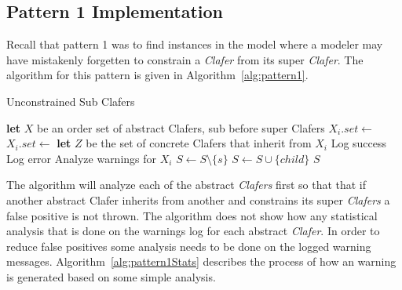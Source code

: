 \documentclass[10pt,oneside]{IEEEtran}
\begin{document}
\subsection{Pattern 1 Implementation}
Recall that pattern 1 was to find instances in the model where a modeler may have mistakenly forgetten to constrain a \textit{Clafer} from its super \textit{Clafer}. The algorithm for this pattern is given in Algorithm~\ref{alg:pattern1}.

\begin{algorithm*}[ht]
\caption{Unconstrained Sub Clafers}\label{alg:pattern1}
\begin{algorithmic}[1]
  \State \textbf{let} $X$ be an order set of abstract Clafers, sub before super Clafers
      \State $X_i.set \gets$ 
    \Else
      \State $X_i.set \gets$ 
    \EndIf
  \EndFor
    \State \textbf{let} $Z$ be the set of concrete Clafers that inherit from $X_i$
          \State Log success
        \Else
          \State Log error
        \EndIf
      \EndFor
      \State Analyze warnings for $X_i$
    \EndFor
  \EndFor
\EndProcedure
{}
      \State $S \gets S \setminus \{s\}$
    \EndIf
   \EndFor
      \State $S \gets S \cup \{child\}$
    \EndIf
   \EndFor
   \State \Return $S$
\EndProcedure
\end{algorithmic}
\end{algorithm*}

The algorithm will analyze each of the abstract \textit{Clafers} first so that that if another abstract Clafer inherits from another and constrains its super \textit{Clafers} a false positive is not thrown. The algorithm does not show how any statistical analysis that is done on the warnings log for each abstract \textit{Clafer}. In order to reduce false positives some analysis needs to be done on the logged warning messages. Algorithm~\ref{alg:pattern1Stats} describes the process of how an warning is generated based on some simple analysis.
\end{document}
